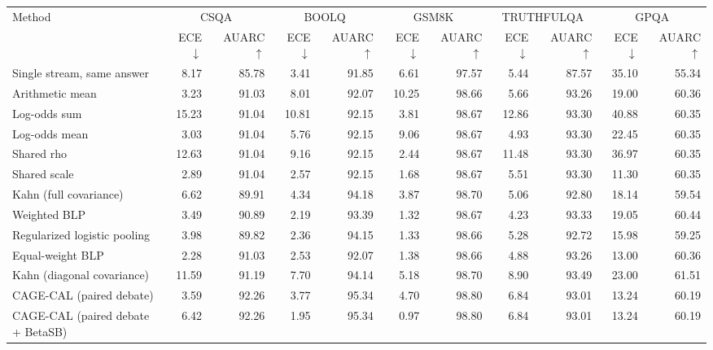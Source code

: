 \begin{tabular}{lrrrrrrrrrr}
\toprule
Method & \multicolumn{2}{c}{CSQA} & \multicolumn{2}{c}{BOOLQ} & \multicolumn{2}{c}{GSM8K} & \multicolumn{2}{c}{TRUTHFULQA} & \multicolumn{2}{c}{GPQA} \\
 & ECE $\downarrow$ & AUARC $\uparrow$ & ECE $\downarrow$ & AUARC $\uparrow$ & ECE $\downarrow$ & AUARC $\uparrow$ & ECE $\downarrow$ & AUARC $\uparrow$ & ECE $\downarrow$ & AUARC $\uparrow$ \\
\midrule
Single stream, same answer & 8.17 & 85.78 & 3.41 & 91.85 & 6.61 & 97.57 & 5.44 & 87.57 & 35.10 & 55.34 \\
Arithmetic mean & 3.23 & 91.03 & 8.01 & 92.07 & 10.25 & 98.66 & 5.66 & 93.26 & 19.00 & 60.36 \\
Log-odds sum & 15.23 & 91.04 & 10.81 & 92.15 & 3.81 & 98.67 & 12.86 & 93.30 & 40.88 & 60.35 \\
Log-odds mean & 3.03 & 91.04 & 5.76 & 92.15 & 9.06 & 98.67 & 4.93 & 93.30 & 22.45 & 60.35 \\
Shared rho & 12.63 & 91.04 & 9.16 & 92.15 & 2.44 & 98.67 & 11.48 & 93.30 & 36.97 & 60.35 \\
Shared scale & 2.89 & 91.04 & 2.57 & 92.15 & 1.68 & 98.67 & 5.51 & 93.30 & 11.30 & 60.35 \\
Kahn (full covariance) & 6.62 & 89.91 & 4.34 & 94.18 & 3.87 & 98.70 & 5.06 & 92.80 & 18.14 & 59.54 \\
Weighted BLP & 3.49 & 90.89 & 2.19 & 93.39 & 1.32 & 98.67 & 4.23 & 93.33 & 19.05 & 60.44 \\
Regularized logistic pooling & 3.98 & 89.82 & 2.36 & 94.15 & 1.33 & 98.66 & 5.28 & 92.72 & 15.98 & 59.25 \\
Equal-weight BLP & 2.28 & 91.03 & 2.53 & 92.07 & 1.38 & 98.66 & 4.88 & 93.26 & 13.00 & 60.36 \\
Kahn (diagonal covariance) & 11.59 & 91.19 & 7.70 & 94.14 & 5.18 & 98.70 & 8.90 & 93.49 & 23.00 & 61.51 \\
CAGE-CAL (paired debate) & 3.59 & 92.26 & 3.77 & 95.34 & 4.70 & 98.80 & 6.84 & 93.01 & 13.24 & 60.19 \\
CAGE-CAL (paired debate + BetaSB) & 6.42 & 92.26 & 1.95 & 95.34 & 0.97 & 98.80 & 6.84 & 93.01 & 13.24 & 60.19 \\
\bottomrule
\end{tabular}
